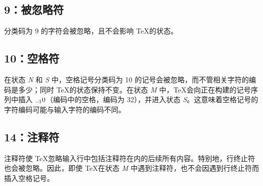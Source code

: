 \documentclass{book}
\begin{document}
\subsection{9：被忽略符}

分类码为 9 的字符会被忽略，且不会影响 \TeX 的状态。

\subsection{10：空格符}

在状态 {\itshape N} 和 {\itshape S} 中，空格记号\ldash 分类码为 10 的记号\rdash 会被忽略，而不管相关字符的编码是多少；同时 \TeX 的状态保持不变。在状态 {\itshape M} 中，\TeX 会向正在构建的记号序列中插入 $ \text{\textvisiblespace}_10 $（\ascii 编码中的空格，编码为 32），并进入状态 {\itshape S}。这意味着空格记号的字符编码可能与输入字符的编码不同。

\subsection{14：注释符}

注释符使 \TeX 忽略输入行中包括注释符在内的后续所有内容。特别地，行终止符也会被忽略。因此，即使 \TeX 在状态 {\itshape M} 中遇到注释符，也不会因遇到行终止符而插入空格记号。

\end{document}
